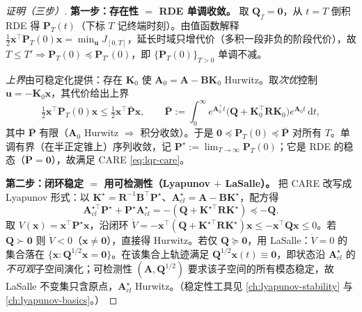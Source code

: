 \begin{proof}[证明（三步）]
\textbf{第一步：存在性 $=$ RDE 单调收敛。}\;
取 $\mathbf Q_f=\mathbf0$，从 $t=T$ 倒积 RDE 得 $\mathbf P_T(t)$（下标 $T$ 记终端时刻）。由值函数解释 $\tfrac12\mathbf x^\top\mathbf P_T(0)\mathbf x=\min_{\mathbf u}J_{[0,T]}$，延长时域只增代价（多积一段非负的阶段代价），故 $T\le T'\Rightarrow\mathbf P_T(0)\preceq\mathbf P_{T'}(0)$，即 $\{\mathbf P_T(0)\}_{T>0}$ 单调不减。

\emph{上界}由可稳定化提供：存在 $\mathbf K_0$ 使 $\mathbf A_0=\mathbf A-\mathbf B\mathbf K_0$ Hurwitz。取\emph{次优}控制 $\mathbf u=-\mathbf K_0\mathbf x$，其代价给出上界
\begin{equation}
  \tfrac12\mathbf x^\top\mathbf P_T(0)\mathbf x\le\tfrac12\mathbf x^\top\bar{\mathbf P}\mathbf x,\qquad
  \bar{\mathbf P}:=\int_0^\infty e^{\mathbf A_0^\top t}\big(\mathbf Q+\mathbf K_0^\top\mathbf R\mathbf K_0\big)e^{\mathbf A_0 t}\,\mathrm dt,
  \label{eq:lqr-upper-bound}
\end{equation}
其中 $\bar{\mathbf P}$ 有限（$\mathbf A_0$ Hurwitz $\Rightarrow$ 积分收敛）。于是 $\mathbf0\preceq\mathbf P_T(0)\preceq\bar{\mathbf P}$ 对所有 $T$。单调有界（在半正定锥上）序列收敛，记 $\mathbf P^\star:=\lim_{T\to\infty}\mathbf P_T(0)$；它是 RDE 的稳态（$\dot{\mathbf P}=\mathbf0$），故满足 CARE \cref{eq:lqr-care}。

\textbf{第二步：闭环稳定 $=$ 用可检测性（Lyapunov $+$ LaSalle）。}\;
把 CARE 改写成 Lyapunov 形式：以 $\mathbf K^\star=\mathbf R^{-1}\mathbf B^\top\mathbf P^\star$、$\mathbf A_{cl}^\star=\mathbf A-\mathbf B\mathbf K^\star$，配方得
\begin{equation}
  \mathbf A_{cl}^{\star\top}\mathbf P^\star+\mathbf P^\star\mathbf A_{cl}^\star=-(\mathbf Q+\mathbf K^{\star\top}\mathbf R\mathbf K^\star)\preceq-\mathbf Q.
  \label{eq:lqr-lyap-form}
\end{equation}
取 $V(\mathbf x)=\mathbf x^\top\mathbf P^\star\mathbf x$，沿闭环 $\dot V=-\mathbf x^\top(\mathbf Q+\mathbf K^{\star\top}\mathbf R\mathbf K^\star)\mathbf x\le-\mathbf x^\top\mathbf Q\mathbf x\le0$。若 $\mathbf Q\succ\mathbf0$ 则 $\dot V<0$（$\mathbf x\ne\mathbf0$），直接得 Hurwitz。若仅 $\mathbf Q\succeq\mathbf0$，用 LaSalle：$\dot V=0$ 的集合落在 $\{\mathbf x:\mathbf Q^{1/2}\mathbf x=\mathbf0\}$。在该集合上轨迹满足 $\mathbf Q^{1/2}\mathbf x(t)\equiv\mathbf0$，即状态沿 $\mathbf A_{cl}^\star$ 的\emph{不可观}子空间演化；可检测性 $(\mathbf A,\mathbf Q^{1/2})$ 要求该子空间的所有模态稳定，故 LaSalle 不变集只含原点，$\mathbf A_{cl}^\star$ Hurwitz。（稳定性工具见 \cref{ch:lyapunov-stability} 与 \cref{ch:lyapunov-basics}。）


\end{proof}
